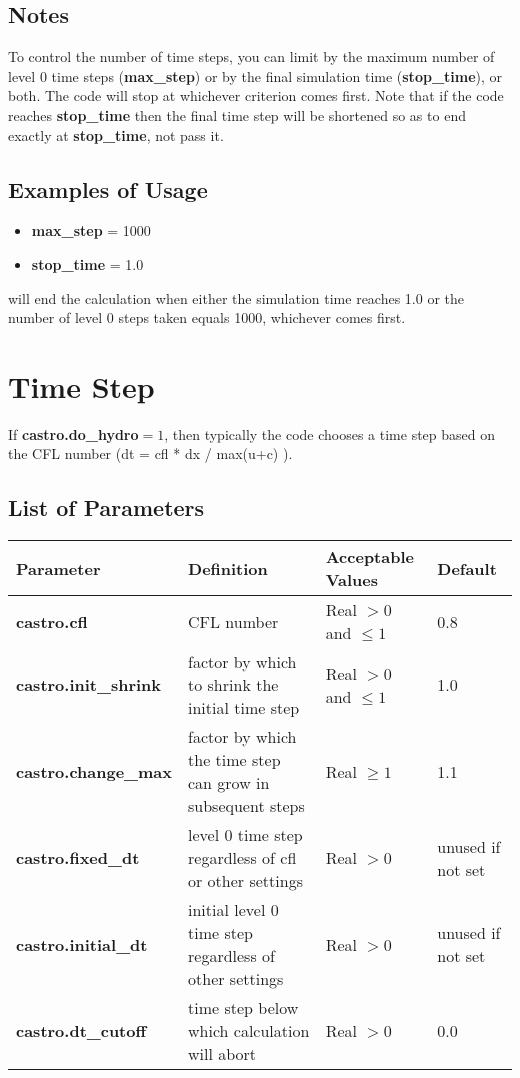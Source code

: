 \subsection{Notes}
To control the number of time steps, you can limit by the maximum number of 
level 0 time steps ({\bf max\_step}) or by the final simulation time ({\bf stop\_time}), 
or both. The code will stop at whichever criterion comes first. 
Note that if the code reaches {\bf stop\_time} then the final time step will be shortened so as to end 
exactly at {\bf stop\_time}, not pass it.

\subsection{Examples of Usage}
\begin{itemize}
\item {\bf max\_step}  = 1000
\item {\bf stop\_time}  = 1.0
\end{itemize}
will end the calculation when either the simulation time reaches 1.0 or 
the number of level 0 steps taken equals 1000, whichever comes first.

\section{Time Step}
If {\bf castro.do\_hydro}$ = 1$, then typically 
the code chooses a time step based on the CFL number (dt = cfl * dx / max(u+c) ).

\subsection{List of Parameters}

\begin{table*}[h]
\begin{scriptsize}
\begin{center}
\begin{tabular}{|l|l|l|l|} \hline
Parameter & Definition & Acceptable Values &Default\\
\hline
{\bf castro.cfl} & CFL number & Real $> 0$ and $\leq 1$ & 0.8 \\ 
{\bf castro.init\_shrink} & factor by which to shrink the initial time step & Real $> 0$ and $\leq 1$ & 1.0 \\ 
{\bf castro.change\_max} & factor by which the time step can grow in subsequent steps & Real $\geq 1$ & 1.1 \\ 
{\bf castro.fixed\_dt} &  level 0 time step regardless of cfl or other settings & Real $> 0$ & unused if not set \\
{\bf castro.initial\_dt} &  initial level 0 time step regardless of other settings & Real $> 0$ & unused if not set \\
{\bf castro.dt\_cutoff} & time step below which calculation will abort & Real $> 0$ & 0.0 \\
\hline
\end{tabular}
\label{Table:TimeStepInputs}
\end{center}
\end{scriptsize}
\end{table*}


